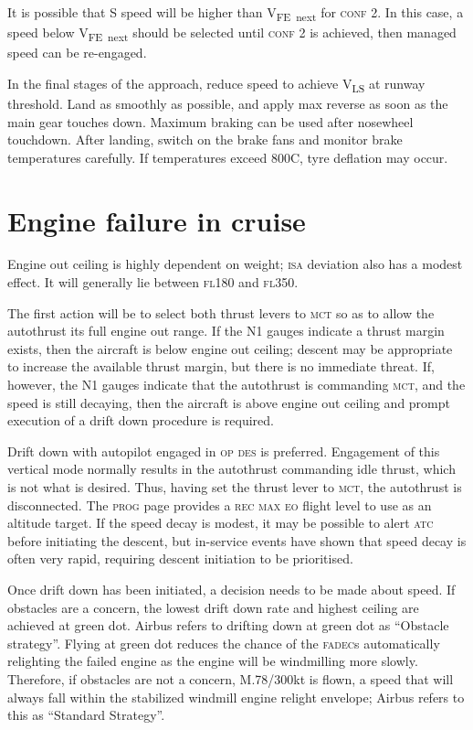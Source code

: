 \documentclass[a5paper,11pt,twoside]{book}
\newcommand{\ac}[1]{{\scshape\MakeLowercase{#1}}}
\newcommand{\inlcite}[1]{{\ac{#1}}}
\newcommand{\multicite}[1]{%
  \nopagebreak
  \noindent{{\color{blue}\footnotesize[\inlcite{#1}]}}
}
\newcommand{\V}[1]{V\textsubscript{#1}}
\begin{document}
It is possible that S speed will be higher than \V{FE~next} for \ac{CONF} 2. In this
case, a speed below \V{FE~next} should be selected until \ac{CONF} 2 is achieved,
then managed speed can be re-engaged.

In the final stages of the approach, reduce speed to achieve \V{LS} at runway
threshold. Land as smoothly as possible, and apply max reverse as soon as the
main gear touches down. Maximum braking can be used after nosewheel
touchdown. After landing, switch on the brake fans and monitor brake
temperatures carefully. If temperatures exceed 800\textdegree C, tyre deflation
may occur.

\multicite{QRH~AER.MISC, FCOM~PRO.AER.MISC, FCTM~PRO.AER.MISC}

\section{Engine failure in cruise}

Engine out ceiling is highly dependent on weight; \ac{ISA} deviation also has a
modest effect. It will generally lie between \ac{FL}180 and \ac{FL}350.

The first action will be to select both thrust levers to \ac{MCT} so as to allow
the autothrust its full engine out range. If the N1 gauges indicate a thrust
margin exists, then the aircraft is below engine out ceiling; descent may be
appropriate to increase the available thrust margin, but there is no immediate
threat. If, however, the N1 gauges indicate that the autothrust is commanding
\ac{MCT}, and the speed is still decaying, then the aircraft is above engine out
ceiling and prompt execution of a drift down procedure is required.

Drift down with autopilot engaged in \ac{OP} \ac{DES} is preferred. Engagement
of this vertical mode normally results in the autothrust commanding idle thrust,
which is not what is desired. Thus, having set the thrust lever to \ac{MCT}, the
autothrust is disconnected. The \ac{PROG} page provides a \ac{REC MAX EO} flight
level to use as an altitude target. If the speed decay is modest, it may be
possible to alert \ac{ATC} before initiating the descent, but in-service events
have shown that speed decay is often very rapid, requiring descent initiation to
be prioritised.

Once drift down has been initiated, a decision needs to be made about speed. If
obstacles are a concern, the lowest drift down rate and highest ceiling are
achieved at green dot. Airbus refers to drifting down at green dot as ``Obstacle
strategy''. Flying at green dot reduces the chance of the \ac{FADEC}s
automatically relighting the failed engine as the engine will be windmilling
more slowly. Therefore, if obstacles are not a concern, M.78/300kt is flown, a
speed that will always fall within the stabilized windmill engine relight
envelope; Airbus refers to this as ``Standard Strategy''.
\end{document}
